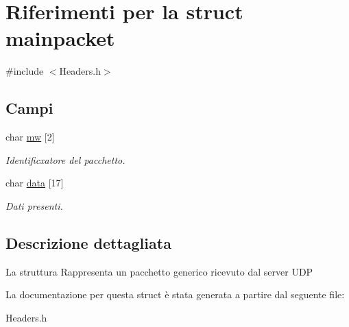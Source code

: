 \hypertarget{structmainpacket}{}\section{Riferimenti per la struct mainpacket}
\label{structmainpacket}


{\ttfamily \#include $<$Headers.\+h$>$}

\subsection*{Campi}
\begin{DoxyCompactItemize}
\item 
char \hyperlink{structmainpacket_a9dffe3f8188b4a0b869d849c5d17f900}{mw} \mbox{[}2\mbox{]}\hypertarget{structmainpacket_a9dffe3f8188b4a0b869d849c5d17f900}{}\label{structmainpacket_a9dffe3f8188b4a0b869d849c5d17f900}

\begin{DoxyCompactList}\small\item\em Identificxatore del pacchetto. \end{DoxyCompactList}\item 
char \hyperlink{structmainpacket_addd5b2d5320ad3b172835f2cb1988eae}{data} \mbox{[}17\mbox{]}\hypertarget{structmainpacket_addd5b2d5320ad3b172835f2cb1988eae}{}\label{structmainpacket_addd5b2d5320ad3b172835f2cb1988eae}

\begin{DoxyCompactList}\small\item\em Dati presenti. \end{DoxyCompactList}\end{DoxyCompactItemize}


\subsection{Descrizione dettagliata}
La struttura Rappresenta un pacchetto generico ricevuto dal server U\+DP 

La documentazione per questa struct è stata generata a partire dal seguente file\+:\begin{DoxyCompactItemize}
\item 
Headers.\+h\end{DoxyCompactItemize}
